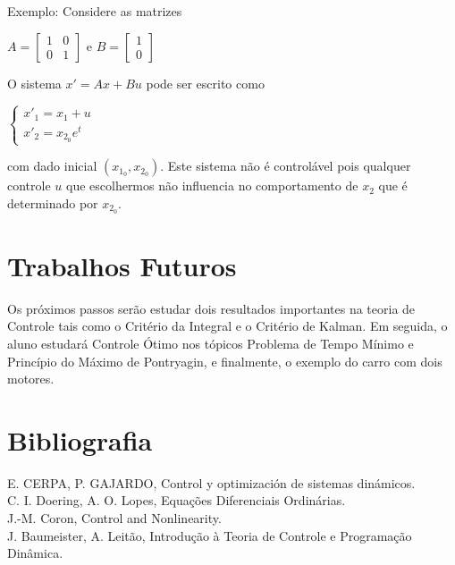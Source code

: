 \documentclass[a4paper, 12pt]{article}
\begin{document}
Exemplo: Considere as matrizes
\begin{center}
    $A = \begin{bmatrix}
    1 & 0 \\
    0 & 1
    \end{bmatrix}$
    e
    $B = \begin{bmatrix}
    1 \\
    0
    \end{bmatrix}$
\end{center}
O sistema $x'=Ax+Bu$ pode ser escrito como
\begin{center}
    $\begin{cases}
    x'_1=x_1+u\\ x'_2=x_{2_0}e^t
    \end{cases}$
\end{center}
com dado inicial $(x_{1_0},x_{2_0})$. Este sistema não é controlável pois qualquer controle $u$ que escolhermos não influencia no comportamento de $x_2$ que é determinado por $x_{2_0}$.
\section{Trabalhos Futuros}
Os próximos passos serão estudar dois resultados importantes na teoria de Controle tais como o Critério da Integral e o Critério de Kalman. Em seguida, o aluno estudará Controle Ótimo nos tópicos Problema de Tempo Mínimo e Princípio do Máximo de Pontryagin, e finalmente, o exemplo do carro com dois motores.

\section*{Bibliografia}
\footnotesize{

\noindent E. CERPA, P. GAJARDO, Control y optimización de sistemas dinámicos.\\
C. I. Doering, A. O. Lopes, Equações Diferenciais Ordinárias.\\
J.-M. Coron, Control and Nonlinearity. \\
J. Baumeister, A. Leitão, Introdução à Teoria de Controle e Programação Dinâmica.
}
\end{document}
